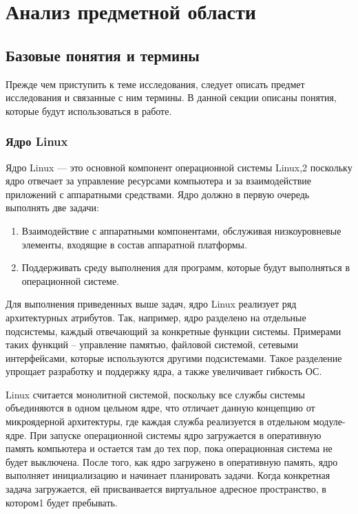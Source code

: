 \section{Анализ предметной области}

\subsection{Базовые понятия и термины}
Прежде чем приступить к теме исследования, следует описать предмет исследования и связанные с ним термины.
В данной секции описаны понятия, которые будут использоваться в работе. 

\subsubsection{Ядро Linux}
Ядро Linux — это основной компонент операционной системы Linux,2
 поскольку ядро отвечает за управление ресурсами компьютера и за взаимодействие приложений с аппаратными средствами.
 Ядро должно в первую очередь выполнять две задачи:
\begin{enumerate}
    \item Взаимодействие с аппаратными компонентами, обслуживая низкоуровневые элементы, входящие в состав аппаратной платформы.
    \item Поддерживать среду выполнения для программ, которые будут выполняться в операционной системе. 
\end{enumerate}

Для выполнения приведенных выше задач, ядро Linux реализует ряд архитектурных атрибутов. 
Так, например, ядро разделено на отдельные подсистемы, каждый отвечающий за конкретные функции системы. 
Примерами таких функций -- управление памятью, файловой системой, сетевыми интерфейсами, которые используются другими подсистемами. 
Такое разделение упрощает разработку и поддержку ядра, а также увеличивает гибкость ОС. 

Linux считается монолитной системой, поскольку все службы системы объединяются в одном цельном ядре, 
что отличает данную концепцию от микроядерной архитектуры, 
где каждая служба реализуется в отдельном модуле-ядре. 
При запуске операционной системы ядро загружается в оперативную память компьютера и остается там до тех пор, 
пока операционная система не будет выключена. 
После того, как ядро загружено в оперативную память, ядро выполняет инициализацию и начинает планировать задачи.
Когда конкретная задача загружается, ей присваивается виртуальное адресное пространство, в котором1 будет пребывать.\vspace{0.5cm}\\

